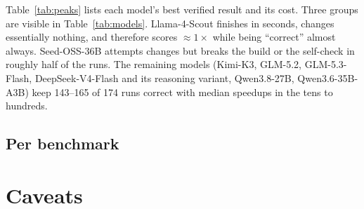 \documentclass[11pt,a4paper]{article}
\begin{document}
\begin{table}[h]
\centering\footnotesize\setlength{\tabcolsep}{4pt}

\caption{Peak verified speedup per model (largest speedup $\le$
\suspiciouscap$\times$ among correct runs) and what it cost: tokens
(input$+$output) and agent wall time of that run, and the totals over the whole
sweep of \nbenchmarks{} benchmarks $\times$ 3 repetitions. The RiVault gateway
reports no monetary price, so cost is given in tokens and agent-hours.}
\label{tab:peaks}
\end{table}

\begin{table}[h]
\centering\footnotesize\setlength{\tabcolsep}{4pt}

\caption{Run outcomes per model. ``agent error'' = the agent produced no output
tokens (API/server error). ``hit 2\,h'' counts runs in which the agent was
killed at the time limit (its last state is still verified and may be correct).}
\label{tab:outcomes}
\end{table}

Table~\ref{tab:peaks} lists each model's best verified result and its cost.
Three groups are visible in Table~\ref{tab:models}. Llama-4-Scout finishes
in seconds, changes essentially nothing, and therefore scores $\approx 1\times$
while being ``correct'' almost always. Seed-OSS-36B attempts changes but breaks
the build or the self-check in roughly half of the runs. The remaining models
(Kimi-K3, GLM-5.2, GLM-5.3-Flash, DeepSeek-V4-Flash and its reasoning variant,
Qwen3.8-27B, Qwen3.6-35B-A3B) keep 143--165 of 174 runs correct with median
speedups in the tens to hundreds.

\subsection{Per benchmark}

\begin{center}\small

\end{center}

\section{Caveats}
\end{document}
